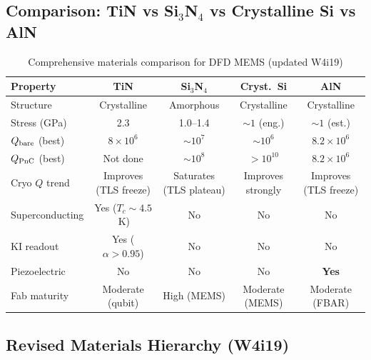 \documentclass[11pt]{article}
\theoremstyle{remark}
\newcommand{\ee}[1]{\times 10^{#1}}
\begin{document}
\subsection{Comparison: TiN vs Si$_3$N$_4$ vs Crystalline Si vs AlN}

\begin{table}[H]
\centering
\caption{Comprehensive materials comparison for DFD MEMS (updated W4i19)}
\label{tab:comparison}
\begin{tabular}{@{}lcccc@{}}
\toprule
Property & TiN & Si$_3$N$_4$ & Cryst.\ Si & AlN \\
\midrule
Structure & Crystalline & Amorphous & Crystalline & Crystalline \\
Stress (GPa) & 2.3 & 1.0--1.4 & $\sim 1$ (eng.) & $\sim 1$ (est.) \\
$Q_{\rm bare}$ (best) & $8\ee{6}$ & $\sim 10^7$ & $\sim 10^6$ & $8.2\ee{6}$ \\
$Q_{\rm PnC}$ (best) & Not done & $\sim 10^8$ & $> 10^{10}$ & $8.2\ee{6}$ \\
Cryo $Q$ trend & Improves (TLS freeze) & Saturates (TLS plateau) &
  Improves strongly & Improves (TLS freeze) \\
Superconducting & Yes ($T_c \sim 4.5$\,K) & No & No & No \\
KI readout & Yes ($\alpha > 0.95$) & No & No & No \\
Piezoelectric & No & No & No & \textbf{Yes} \\
Fab maturity & Moderate (qubit) & High (MEMS) & Moderate (MEMS) &
  Moderate (FBAR) \\
\bottomrule
\end{tabular}
\end{table}

\subsection{Revised Materials Hierarchy (W4i19)}
\end{document}
